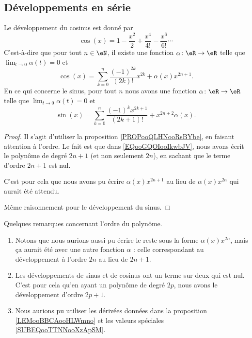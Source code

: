\subsection{Développements en série}

\begin{proposition}     \label{PROPooNPYXooTuwAHP}
	Le développement du cosinus est donné par
	\begin{equation}
		\cos(x)=1-\frac{ x^2 }{ 2 }+\frac{ x^4 }{ 4! }-\frac{ x^6 }{ 6! }\cdots
	\end{equation}
	C'est-à-dire que pour tout \( n\in  \eN\), il existe une fonction \( \alpha\colon \eR\to \eR\) telle que \( \lim_{t\to 0} \alpha(t)=0\) et
	\begin{equation}        \label{EQooGQOIooIkwbJV}
		\cos(x)=\sum_{k=0}^{n}\frac{ (-1)^{2k} }{ (2k)! }x^{2k}+\alpha(x)x^{2n+1}.
	\end{equation}
	En ce qui concerne le sinus, pour tout \( n\) nous avons une fonction \( \alpha\colon \eR\to \eR\) telle que \( \lim_{t\to 0} \alpha(t)=0\) et
	\begin{equation}        \label{EQooKYJAooRebHgc}
		\sin(x)=\sum_{k=0}^n\frac{ (-1)^kx^{2k+1} }{ (2k+1)! }+x^{2n+2}\alpha(x).
	\end{equation}
\end{proposition}

\begin{proof}
	Il s'agit d'utiliser la proposition \ref{PROPooQLHNooRsBYbe}, en faisant attention à l'ordre. Le fait est que dans \eqref{EQooGQOIooIkwbJV}, nous avons écrit le polynôme de degré \( 2n+1\) (et non seulement \( 2n\)), en sachant que le terme d'ordre \( 2n+1\) est nul.

	C'est pour cela que nous avons pu écrire \( \alpha(x)x^{2n+1}\) au lieu de \( \alpha(x)x^{2n}\) qui aurait été attendu.

	Même raisonnement pour le développement du sinus.
\end{proof}

\begin{remark}
	Quelques remarques concernant l'ordre du polynôme.
	\begin{enumerate}
		\item
		      Notons que nous aurions aussi pu écrire le reste sous la forme \( \alpha(x)x^{2n}\), mais ça aurait été avec une autre fonction \( \alpha\) : celle correspondant au développement à l'ordre \( 2n\) au lieu de \( 2n+1\).
		\item

		      Les développements de sinus et de cosinus ont un terme sur deux qui est nul. C'est pour cela qu'en ayant un polynôme de degré \( 2p\), nous avons le développement d'ordre \( 2p+1\).
		\item
		      Nous aurions pu utiliser les dérivées données dans la proposition \ref{LEMooBBCAooHLWmno} et les valeurs spéciales \eqref{SUBEQooTTNNooXzApSM}.
	\end{enumerate}
\end{remark}

